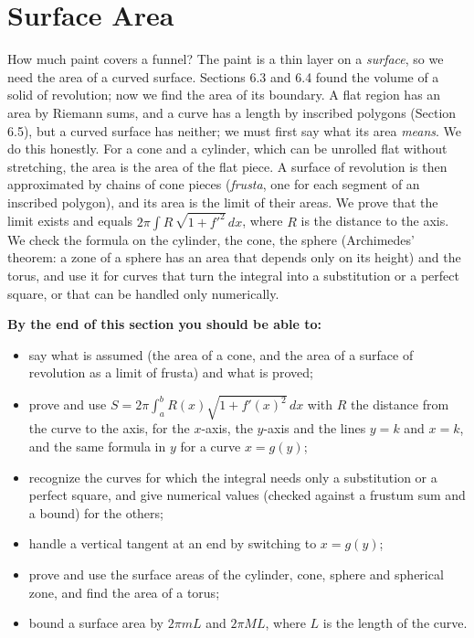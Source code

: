 \documentclass[11pt]{article}
\begin{document}
\section{Surface Area}

\begin{guide}
How much paint covers a funnel? The paint is a thin layer on a \emph{surface}, so we need the area of a curved surface. Sections 6.3 and 6.4 found the volume of a solid of revolution; now we find the area of its boundary. A flat region has an area by Riemann sums, and a curve has a length by inscribed polygons (Section 6.5), but a curved surface has neither; we must first say what its area \emph{means}. We do this honestly. For a cone and a cylinder, which can be unrolled flat without stretching, the area is the area of the flat piece. A surface of revolution is then approximated by chains of cone pieces (\emph{frusta}, one for each segment of an inscribed polygon), and its area is the limit of their areas. We prove that the limit exists and equals $2\pi\int R\,\sqrt{1+f'^2}\,dx$, where $R$ is the distance to the axis. We check the formula on the cylinder, the cone, the sphere (Archimedes' theorem: a zone of a sphere has an area that depends only on its height) and the torus, and use it for curves that turn the integral into a substitution or a perfect square, or that can be handled only numerically.
\end{guide}

\textbf{By the end of this section you should be able to:}
\begin{itemize}
  \item say what is assumed (the area of a cone, and the area of a surface of revolution as a limit of frusta) and what is proved;
  \item prove and use $S=2\pi\int_a^bR(x)\sqrt{1+f'(x)^2}\,dx$ with $R$ the distance from the curve to the axis, for the $x$-axis, the $y$-axis and the lines $y=k$ and $x=k$, and the same formula in $y$ for a curve $x=g(y)$;
  \item recognize the curves for which the integral needs only a substitution or a perfect square, and give numerical values (checked against a frustum sum and a bound) for the others;
  \item handle a vertical tangent at an end by switching to $x=g(y)$;
  \item prove and use the surface areas of the cylinder, cone, sphere and spherical zone, and find the area of a torus;
  \item bound a surface area by $2\pi m L$ and $2\pi M L$, where $L$ is the length of the curve.
\end{itemize}
\end{document}
